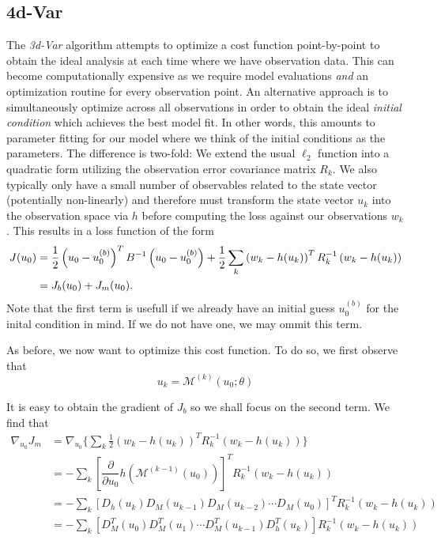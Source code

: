 \subsection{4d-Var}

The \textit{3d-Var} algorithm attempts to optimize a cost function point-by-point to obtain the ideal analysis at each time where we have observation data. This can become computationally expensive as we require model evaluations \textit{and} an optimization routine for every observation point. An alternative approach is to simultaneously optimize across all observations in order to obtain the ideal \textit{initial condition} which achieves the best model fit. In other words, this amounts to parameter fitting for our model where we think of the initial conditions as the parameters. The difference is two-fold: We extend the usual $\ell_2$ function into a quadratic form utilizing the observation error covariance matrix $R_k$. We also typically only have a small number of observables related to the state vector (potentially non-linearly) and therefore must transform the state vector $u_k$ into the observation space via $h$ before computing the loss against our observations $w_k$. This results in a loss function of the form
\begin{align}
    J(u_0) &= \frac{1}{2}\left( u_0 - u_0^{(b)} \right)^TB^{-1}\left( u_0 - u_0^{(b)} \right) + \frac{1}{2}\sum_k\left(w_k - h(u_k) \right)^TR_k^{-1}\left(w_k - h(u_k) \right) \\
           &= J_b(u_0) + J_m(u_0) \notag.
\end{align}
Note that the first term is usefull if we already have an initial guess $u_0^{(b)}$ for the inital condition in mind. If we do not have one, we may ommit this term.


As before, we now want to optimize this cost function. To do so, we first observe that
\begin{equation}
    u_k = \mathcal{M}^{(k)}(u_0; \theta)
\end{equation}

It is easy to obtain the gradient of $J_b$ so we shall focus on the second term. We find that
\begin{align}
    \nabla_{u_0}J_m &= \nabla_{u_0}\Big\{ \sum_k \frac{1}{2}  \left(w_k - h(u_k) \right)^TR_k^{-1}\left(w_k - h(u_k) \right) \Big\}\\
                    &= - \sum_k \left[\dfrac{\partial }{\partial u_0}h\left(\mathcal{M}^{(k-1)}(u_0)\right) \right]^T R_k^{-1}\left(w_k - h(u_k) \right)\\
                    &= - \sum_k \left[D_h(u_k)D_M(u_{k-1})D_M(u_{k-2})\cdots D_M(u_0) \right]^T R_k^{-1}\left(w_k - h(u_k) \right)\\
                    &= - \sum_k \left[D_M^T(u_0)D_M^T(u_1)\cdots D_M^T(u_{k-1})D_h^T(u_k) \right] R_k^{-1}\left(w_k - h(u_k) \right)
\end{align}

